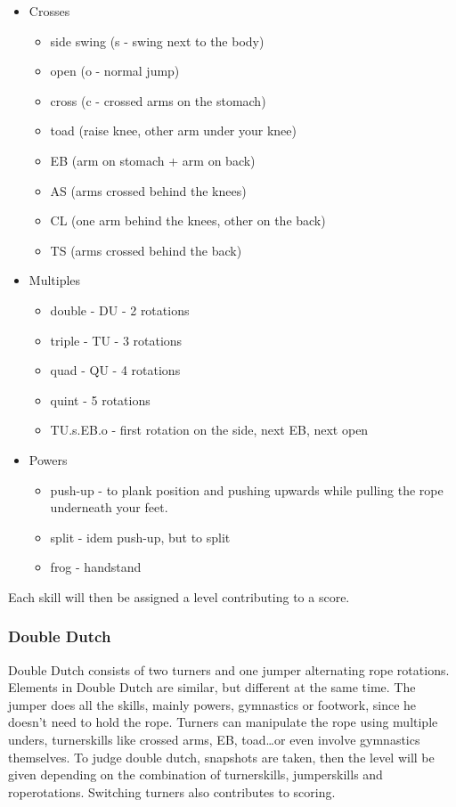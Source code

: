 \begin{itemize}
    \item Crosses
    \begin{itemize}
        \item side swing (s - swing next to the body)
        \item open (o - normal jump)
        \item cross (c - crossed arms on the stomach)
        \item toad (raise knee, other arm under your knee)
        \item EB (arm on stomach + arm on back)
        \item AS (arms crossed behind the knees)
        \item CL (one arm behind the knees, other on the back)
        \item TS (arms crossed behind the back)
    \end{itemize}
    \item Multiples
    \begin{itemize}
        \item double - DU - 2 rotations
        \item triple - TU - 3 rotations
        \item quad - QU - 4 rotations
        \item quint - 5 rotations
        \item TU.s.EB.o - first rotation on the side, next EB, next open
    \end{itemize}
    \item Powers
    \begin{itemize}
        \item push-up - to plank position and pushing upwards while pulling the rope underneath your feet.
        \item split - idem push-up, but to split
        \item frog - handstand
    \end{itemize}
\end{itemize}

Each skill will then be assigned a level contributing to a score. 

\subsubsection{Double Dutch}
\label{subsubsec:double dutch}

Double Dutch consists of two turners and one jumper alternating rope rotations. Elements in Double Dutch are similar, but different at the same time. The jumper does all the skills, mainly powers, gymnastics or footwork, since he doesn't need to hold the rope. Turners can manipulate the rope using multiple unders, turnerskills like crossed arms, EB, toad\dots or even involve gymnastics themselves.
To judge double dutch, snapshots are taken, then the level will be given depending on the combination of turnerskills, jumperskills and roperotations.
Switching turners also contributes to scoring.

